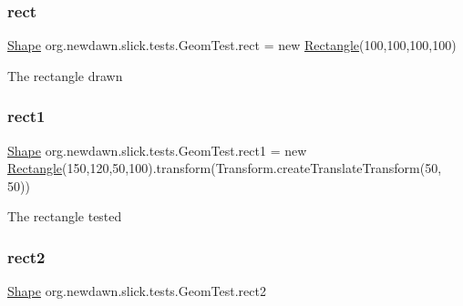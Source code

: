 \subsubsection{\texorpdfstring{rect}{rect}}
{\footnotesize\ttfamily \mbox{\hyperlink{classorg_1_1newdawn_1_1slick_1_1geom_1_1_shape}{Shape}} org.\+newdawn.\+slick.\+tests.\+Geom\+Test.\+rect = new \mbox{\hyperlink{classorg_1_1newdawn_1_1slick_1_1geom_1_1_rectangle}{Rectangle}}(100,100,100,100)\hspace{0.3cm}{\ttfamily [private]}}

The rectangle drawn \mbox{\label{classorg_1_1newdawn_1_1slick_1_1tests_1_1_geom_test_a2d04438f8f41827e625babf80383948d}} 
\subsubsection{\texorpdfstring{rect1}{rect1}}
{\footnotesize\ttfamily \mbox{\hyperlink{classorg_1_1newdawn_1_1slick_1_1geom_1_1_shape}{Shape}} org.\+newdawn.\+slick.\+tests.\+Geom\+Test.\+rect1 = new \mbox{\hyperlink{classorg_1_1newdawn_1_1slick_1_1geom_1_1_rectangle}{Rectangle}}(150,120,50,100).transform(Transform.\+create\+Translate\+Transform(50, 50))\hspace{0.3cm}{\ttfamily [private]}}

The rectangle tested \mbox{\label{classorg_1_1newdawn_1_1slick_1_1tests_1_1_geom_test_a6fb3662ef49d1cb417105d0e507a61cc}} 
\subsubsection{\texorpdfstring{rect2}{rect2}}
{\footnotesize\ttfamily \mbox{\hyperlink{classorg_1_1newdawn_1_1slick_1_1geom_1_1_shape}{Shape}} org.\+newdawn.\+slick.\+tests.\+Geom\+Test.\+rect2\hspace{0.3cm}{\ttfamily [private]}}

